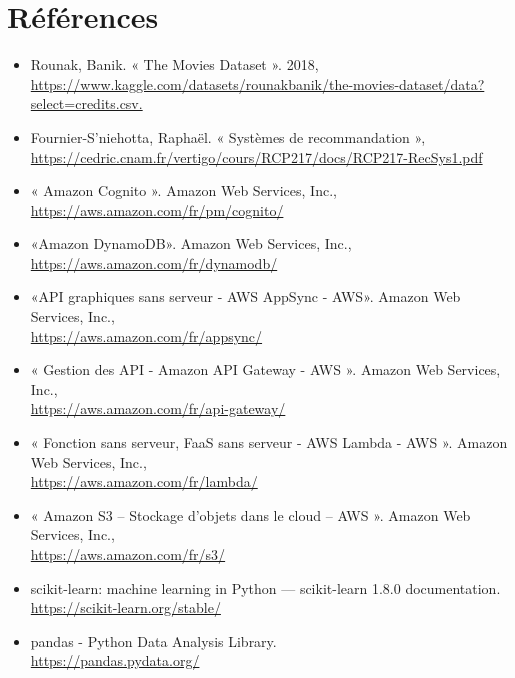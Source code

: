 \documentclass[a4paper,12pt]{report}
\begin{document}
\chapter*{Références}
\begin{itemize}
    \item Rounak,  Banik. « The Movies Dataset ». 2018,\\ \url{https://www.kaggle.com/datasets/rounakbanik/the-movies-dataset/data?select=credits.csv.}
    \item Fournier-S’niehotta, Raphaël. « Systèmes de recommandation »,\\
    \url{https://cedric.cnam.fr/vertigo/cours/RCP217/docs/RCP217-RecSys1.pdf}

    \item « Amazon Cognito ». Amazon Web Services, Inc.,\\
    \url{https://aws.amazon.com/fr/pm/cognito/}

    \item «Amazon DynamoDB». Amazon Web Services, Inc.,\\
    \url{https://aws.amazon.com/fr/dynamodb/}

    \item «API graphiques sans serveur - AWS AppSync - AWS». Amazon Web Services, Inc.,\\
    \url{https://aws.amazon.com/fr/appsync/}

    \item « Gestion des API - Amazon API Gateway - AWS ». Amazon Web Services, Inc.,\\ \url{https://aws.amazon.com/fr/api-gateway/}

    \item « Fonction sans serveur, FaaS sans serveur - AWS Lambda - AWS ». Amazon Web Services, Inc.,\\
    \url{https://aws.amazon.com/fr/lambda/}

    \item « Amazon S3 – Stockage d’objets dans le cloud – AWS ». Amazon Web Services, Inc.,\\
    \url{https://aws.amazon.com/fr/s3/}

    \item scikit-learn: machine learning in Python — scikit-learn 1.8.0 documentation.\\
    \url{https://scikit-learn.org/stable/}

    \item pandas - Python Data Analysis Library.\\
    \url{https://pandas.pydata.org/}


\end{itemize}
\end{document}
